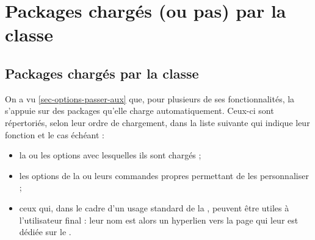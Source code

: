 \chapter{Packages chargés (ou pas) par la classe}\label{cha-packages-charges}

\section{Packages chargés par la classe}\label{sec-packages-charges-par}

On a vu \vref{sec-options-passer-aux} que, pour plusieurs de ses
fonctionnalités, la \yatCl{} s'appuie sur des packages
qu'elle charge automatiquement. Ceux-ci sont répertoriés, selon leur ordre de
chargement, dans la liste suivante qui indique leur fonction et le cas échéant :
\begin{itemize}
\item la ou les options avec lesquelles ils sont chargés ;
\item les options de la \yatCl{} ou leurs commandes propres permettant de les
  personnaliser ;
\item ceux qui, dans le cadre d'un usage standard de la \yatCl{}, peuvent être
  utiles à l'utilisateur final : leur nom est alors un hyperlien vers la page
  qui leur est dédiée sur le .
\end{itemize}

